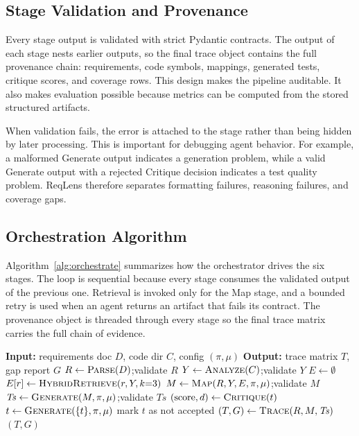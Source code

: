 \documentclass[conference]{IEEEtran}
\begin{document}
\subsection{Stage Validation and Provenance}
Every stage output is validated with strict Pydantic contracts. The output of
each stage nests earlier outputs, so the final trace object contains the full
provenance chain: requirements, code symbols, mappings, generated tests,
critique scores, and coverage rows. This design makes the pipeline auditable.
It also makes evaluation possible because metrics can be computed from the
stored structured artifacts.

When validation fails, the error is attached to the stage rather than being
hidden by later processing. This is important for debugging agent behavior.
For example, a malformed Generate output indicates a generation problem, while
a valid Generate output with a rejected Critique decision indicates a test
quality problem. ReqLens therefore separates formatting failures, reasoning
failures, and coverage gaps.

\subsection{Orchestration Algorithm}
Algorithm~\ref{alg:orchestrate} summarizes how the orchestrator drives the six
stages. The loop is sequential because every stage consumes the validated
output of the previous one. Retrieval is invoked only for the Map stage, and a
bounded retry is used when an agent returns an artifact that fails its
contract. The provenance object is threaded through every stage so the final
trace matrix carries the full chain of evidence.

\begin{algorithm}[htbp]
\caption{ReqLens pipeline orchestration}
\label{alg:orchestrate}
\begin{algorithmic}[1]
\STATE \textbf{Input:} requirements doc $D$, code dir $C$, config $(\pi,\mu)$
\STATE \textbf{Output:} trace matrix $T$, gap report $G$
\STATE $R \leftarrow \textsc{Parse}(D)$;\quad validate $R$
\STATE $Y \leftarrow \textsc{Analyze}(C)$;\quad validate $Y$
\STATE $E \leftarrow \emptyset$
  \STATE $E[r] \leftarrow \textsc{HybridRetrieve}(r, Y, k{=}3)$ 
\ENDFOR
\STATE $M \leftarrow \textsc{Map}(R, Y, E, \pi, \mu)$;\quad validate $M$
\STATE $\mathit{Ts} \leftarrow \textsc{Generate}(M, \pi, \mu)$;\quad validate $\mathit{Ts}$
  \STATE $(\text{score}, d) \leftarrow \textsc{Critique}(t)$
    \STATE $t \leftarrow \textsc{Generate}(\{t\}, \pi, \mu)$ 
    \STATE mark $t$ as not accepted
  \ENDIF
\ENDFOR
\STATE $(T, G) \leftarrow \textsc{Trace}(R, M, \mathit{Ts})$
\RETURN $(T, G)$
\end{algorithmic}
\end{algorithm}
\end{document}
